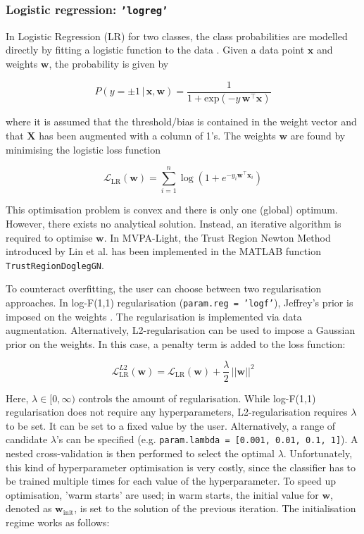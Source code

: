 \documentclass[utf8]{frontiersSCNS} %
\newcommand{\w}{\mathbf{w}}
\newcommand{\x}{\mathbf{x}}
\renewcommand{\L}{\mathcal{L}}
\newcommand{\X}{\mathbf{X}}
\newcommand{\mvpa}{MVPA-Light}
\newcommand{\ttt}[1]{\texttt{#1}}
\begin{document}
\subsubsection{Logistic regression: \ttt{'logreg'}}

In Logistic Regression (LR) for two classes, the class probabilities are modelled directly by fitting a logistic function to the data \cite{Hastie2009}. Given a data point $\x$ and weights $\w$, the probability is given by

\begin{equation}
\label{eq:logreg_probability}
P(y = \pm 1\,|\,\x,\w) = \frac{1}{1 + \text{exp}(-y\,\w^\top\x)}
\end{equation}

where it is assumed that the threshold/bias is contained in the weight vector and that $\X$ has been augmented with a column of 1's. The weights $\w$ are found by minimising the logistic loss function

\begin{equation}
\label{eq:logreg_loss_function}
\L_\text{LR}(\w) = \sum_{i=1}^n \log(1 + e^{-y_i\w^\top\x_i})
\end{equation}

This optimisation problem is convex and there is only one (global) optimum. However, there exists no analytical solution. Instead, an iterative algorithm is required to optimise $\w$. In \mvpa{}, the Trust Region Newton Method introduced by Lin et al. \cite{Lin2007TrustRegression} has been implemented in the MATLAB function \ttt{TrustRegionDoglegGN}.

To counteract overfitting, the user can choose between two regularisation approaches. In log-F(1,1) regularisation (\ttt{param.reg = 'logf'}), Jeffrey's prior is imposed on the weights \cite{Firth1993BiasEstimates,Rahman2017PerformanceData.,King2001}. The regularisation is implemented via data augmentation. Alternatively, L2-regularisation can be used to impose a Gaussian prior on the weights. In this case, a penalty term is added to the loss function:

\begin{equation}
\label{eq:logreg_loss_function}
\L_\text{LR}^{L2}(\w) = \L_\text{LR}(\w) + \frac{\lambda}{2}\, ||\w||^2
\end{equation}

Here, $\lambda\in [0,\infty)$ controls the amount of regularisation. While log-F(1,1) regularisation does not require any hyperparameters, L2-regularisation requires $\lambda$ to be set. It can be set to a fixed value by the user. Alternatively, a range of candidate $\lambda$'s can be specified (e.g. \ttt{param.lambda = [0.001, 0.01, 0.1, 1]}). A nested cross-validation is then performed to select the optimal $\lambda$.
Unfortunately, this kind of hyperparameter optimisation is very costly, since the classifier has to be trained multiple times for each value of the hyperparameter. To speed up optimisation, 'warm starts' are used; in warm starts, the initial value for $\w$, denoted as  $\w_\text{init}$, is set to the solution of the previous iteration. The initialisation regime works as follows:
\end{document}
